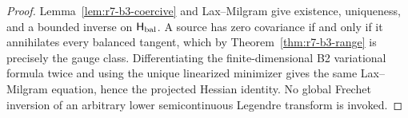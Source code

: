 \begin{proof}
Lemma~\ref{lem:r7-b3-coercive} and Lax--Milgram give existence, uniqueness,
and a bounded inverse on $\mathsf H_{\rm bal}$.  A source has zero covariance
if and only if it annihilates every balanced tangent, which by
Theorem~\ref{thm:r7-b3-range} is precisely the gauge class.  Differentiating
the finite-dimensional B2 variational formula twice and using the unique
linearized minimizer gives the same Lax--Milgram equation, hence the projected
Hessian identity.  No global Frechet inversion of an arbitrary lower
semicontinuous Legendre transform is invoked.
\end{proof}

